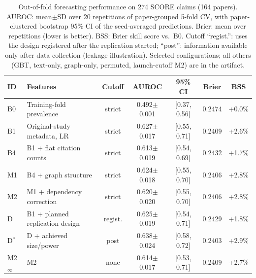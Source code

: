 \begin{table}[t]\centering\caption{Out-of-fold forecasting performance on 274 SCORE claims (164 papers). AUROC: mean$\pm$SD over 20 repetitions of paper-grouped 5-fold CV, with paper-clustered bootstrap 95\% CI of the seed-averaged predictions. Brier: mean over repetitions (lower is better). BSS: Brier skill score vs.\ B0. Cutoff ``regist.'': uses the design registered after the replication started; ``post'': information available only after data collection (leakage illustration). Selected configurations; all others (GBT, text-only, graph-only, permuted, launch-cutoff M2) are in the artifact.}\label{tab:main}
\footnotesize\setlength{\tabcolsep}{6pt}\begin{tabular}{@{}llccccc@{}}\toprule
ID & Features & Cutoff & AUROC & 95\% CI & Brier & BSS \\\midrule
B0 & Training-fold prevalence & strict & 0.492$\pm$0.001 & [0.37, 0.56] & 0.2474 & +0.0\% \\
B1 & Original-study metadata, LR & strict & 0.627$\pm$0.017 & [0.55, 0.71] & 0.2409 & +2.6\% \\
B4 & B1 + flat citation counts & strict & 0.613$\pm$0.019 & [0.54, 0.69] & 0.2432 & +1.7\% \\
M1 & B4 + graph structure & strict & 0.624$\pm$0.018 & [0.55, 0.70] & 0.2406 & +2.8\% \\
M2 & M1 + dependency correction & strict & 0.620$\pm$0.020 & [0.55, 0.70] & 0.2406 & +2.8\% \\
\midrule
D & B1 + planned replication design & regist. & 0.625$\pm$0.019 & [0.54, 0.71] & 0.2429 & +1.8\% \\
D$^{*}$ & D + achieved size/power & post & 0.638$\pm$0.024 & [0.58, 0.72] & 0.2403 & +2.9\% \\
\midrule
M2$_\infty$ & M2 & none & 0.614$\pm$0.017 & [0.53, 0.71] & 0.2409 & +2.7\% \\
\bottomrule\end{tabular}\end{table}
